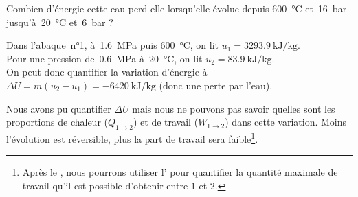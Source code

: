 			\begin{anexample}
			Combien d’énergie cette eau perd-elle lorsqu’elle évolue depuis \SI{600}{\degreeCelsius} et~\SI{16}{\bar} jusqu’à~\SI{20}{\degreeCelsius} et~\SI{6}{\bar} ?
			
				\begin{answer}Dans l’abaque~n°1, à~\SI{1,6}{\mega\pascal} puis \SI{600}{\degreeCelsius}, on lit $u_1 = \SI{3293,9}{\kilo\joule\per\kilogram}$.\\
				Pour une pression de~\SI{0,6}{\mega\pascal} à~\SI{20}{\degreeCelsius}, on lit $u_2 = \SI{83,9}{\kilo\joule\per\kilogram}$.\\
				On peut donc quantifier la variation d’énergie à $\Delta U = m (u_2 - u_1) = \SI{-6420}{\kilo\joule\per\kilogram}$ (donc une perte par l’eau).
			
				\begin{remark}Nous avons pu quantifier $\Delta U$ mais nous ne pouvons pas savoir quelles sont les proportions de chaleur ($Q_{1 \to 2}$) et de travail ($W_{1 \to 2}$) dans cette variation. Moins l’évolution est réversible, plus la part de travail sera faible\footnote{Après le \courshuit, nous pourrons utiliser l’ pour quantifier la quantité maximale de travail qu’il est possible d’obtenir entre $1$ et $2$.}.\end{remark}\end{answer}
			\end{anexample}
	
